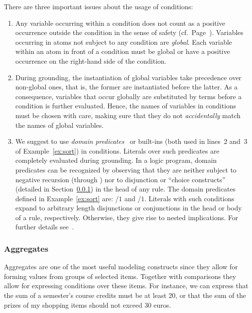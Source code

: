 \begin{note}
There are three important issues about the usage of conditions:
\begin{enumerate}
%
\item 
Any variable occurring within a condition 
does not count as a positive occurrence outside the condition
in the sense of safety (cf.\ Page~\pageref{pg:safe}).
Variables occurring in atoms not subject to any condition are \emph{global}. 
Each variable within an atom in front of a condition 
must be global or have a positive occurrence on the right-hand side of
the condition.
%
\item
During grounding,
the instantiation of global variables take precedence over non-global ones,
that is, the former are instantiated before the latter.
As a consequence, variables that occur globally are substituted by terms
before a condition is further evaluated.
Hence, the names of variables in conditions must be chosen with care,
making sure that they do not \emph{accidentally} match the names of global variables.
%
\item 
We suggest to use \emph{domain predicates}~\cite{lparseManual}
or built-ins (both used in lines~2 and~3  of Example~\ref{ex:sort})
in conditions.
%
%
\label{pg:domain}%
Literals over such predicates are completely evaluated during grounding.
In a logic program, domain predicates can be recognized by observing
that they are neither subject to negative recursion (through )
nor to disjunction or ``choice constructs'' (detailed in Section~\ref{subsec:gringo:aggregate})
in the head of any rule.
The domain predicates defined in Example~\ref{ex:sort} are:
/$1$ and /$1$.
Literals with such conditions expand to arbitrary length disjunctions or conjunctions in the head or body of a rule, respectively.
Otherwise, they give rise to nested implications.
For further details see~\cite{haliya14a}.
\end{enumerate}
\end{note}

\subsubsection{Aggregates}\label{subsec:gringo:aggregate}

Aggregates are one of the most useful modeling constructs since they allow for forming values from groups of selected items.
Together with comparisons they allow for expressing conditions over these items.
For instance, we can express that the sum of a semester's course credits must be at least 20, 
or that the sum of the prizes of my shopping items should not exceed 30 euros.

